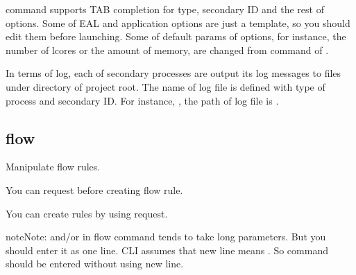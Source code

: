 \documentclass[a4paper,11pt,openany,oneside,english]{sphinxmanual}
\begin{document}
 command supports TAB completion for type, secondary ID and the rest
of options. Some of EAL and application options are just a template, so you
should edit them before launching. Some of default params of options,
for instance, the number of lcores or the amount of memory, are changed from
 command of {\hyperref[\detokenize{commands/common:commands-common-config}]{}}.

In terms of log, each of secondary processes are output its log messages to
files under  directory of project root. The name of log file is defined
with type of process and secondary ID. For instance, , the path of log
file is .


\subsection{flow}
\label{\detokenize{commands/primary:flow}}\label{\detokenize{commands/primary:commands-primary-flow}}
Manipulate flow rules.

You can request  before creating flow rule.

\begin{sphinxVerbatim}[commandchars=\\\{\},formatcom=\footnotesize]
\end{sphinxVerbatim}

You can create rules by using  request.

\begin{sphinxVerbatim}[commandchars=\\\{\},formatcom=\footnotesize]
\end{sphinxVerbatim}

\begin{sphinxadmonition}{note}{Note:}
 and/or  in flow command tends to take long
parameters. But you should enter it as one line.
CLI assumes that new line means . So command
should be entered without using new line.
\end{sphinxadmonition}
\end{document}
